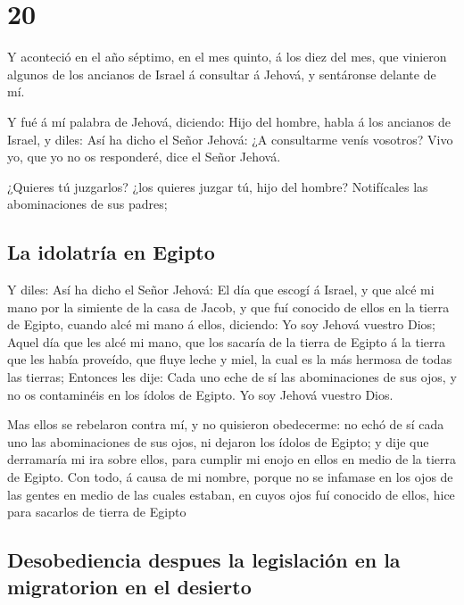 \hypertarget{section-19}{%
\section{20}\label{section-19}}

 Y aconteció en el año séptimo, en el mes quinto, á los diez
del mes, que vinieron algunos de los ancianos de Israel á consultar á
Jehová, y sentáronse delante de mí.

 Y fué á mí palabra de Jehová, diciendo:  Hijo
del hombre, habla á los ancianos de Israel, y diles: Así ha dicho el
Señor Jehová: ¿A consultarme venís vosotros? Vivo yo, que yo no os
responderé, dice el Señor Jehová.

 ¿Quieres tú juzgarlos? ¿los quieres juzgar tú, hijo del
hombre? Notifícales las abominaciones de sus padres;

\hypertarget{la-idolatruxeda-en-egipto}{%
\subsection{La idolatría en Egipto}\label{la-idolatruxeda-en-egipto}}

 Y diles: Así ha dicho el Señor Jehová: El día que escogí á
Israel, y que alcé mi mano por la simiente de la casa de Jacob, y que
fuí conocido de ellos en la tierra de Egipto, cuando alcé mi mano á
ellos, diciendo: Yo soy Jehová vuestro Dios;  Aquel día que
les alcé mi mano, que los sacaría de la tierra de Egipto á la tierra que
les había proveído, que fluye leche y miel, la cual es la más hermosa de
todas las tierras;  Entonces les dije: Cada uno eche de sí
las abominaciones de sus ojos, y no os contaminéis en los ídolos de
Egipto. Yo soy Jehová vuestro Dios.

 Mas ellos se rebelaron contra mí, y no quisieron
obedecerme: no echó de sí cada uno las abominaciones de sus ojos, ni
dejaron los ídolos de Egipto; y dije que derramaría mi ira sobre ellos,
para cumplir mi enojo en ellos en medio de la tierra de Egipto.
 Con todo, á causa de mi nombre, porque no se infamase en
los ojos de las gentes en medio de las cuales estaban, en cuyos ojos fuí
conocido de ellos, hice para sacarlos de tierra de Egipto

\hypertarget{desobediencia-despues-la-legislaciuxf3n-en-la-migratorion-en-el-desierto}{%
\subsection{Desobediencia despues la legislación en la migratorion en el
desierto}\label{desobediencia-despues-la-legislaciuxf3n-en-la-migratorion-en-el-desierto}}

